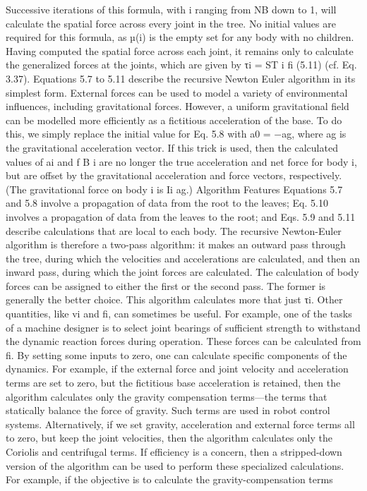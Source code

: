 Successive iterations of this formula, with i ranging from NB down to 1, will calculate the spatial force across every joint in the tree. No initial values are required for this formula, as µ(i) is the empty set for any body with no children. Having computed the spatial force across each joint, it remains only to calculate the generalized forces at the joints, which are given by τi = ST i fi (5.11) (cf. Eq. 3.37). Equations 5.7 to 5.11 describe the recursive Newton Euler algorithm in its simplest form. External forces can be used to model a variety of environmental influences, including gravitational forces. However, a uniform gravitational field can be modelled more efficiently as a fictitious acceleration of the base. To do this, we simply replace the initial value for Eq. 5.8 with a0 = −ag, where ag is the gravitational acceleration vector. If this trick is used, then the calculated values of ai and f B i are no longer the true acceleration and net force for body i, but are offset by the gravitational acceleration and force vectors, respectively. (The gravitational force on body i is Ii ag.) Algorithm Features Equations 5.7 and 5.8 involve a propagation of data from the root to the leaves; Eq. 5.10 involves a propagation of data from the leaves to the root; and Eqs. 5.9 and 5.11 describe calculations that are local to each body. The recursive Newton-Euler algorithm is therefore a two-pass algorithm: it makes an outward pass through the tree, during which the velocities and accelerations are calculated, and then an inward pass, during which the joint forces are calculated. The calculation of body forces can be assigned to either the first or the second pass. The former is generally the better choice. This algorithm calculates more that just τi. Other quantities, like vi and fi, can sometimes be useful. For example, one of the tasks of a machine designer is to select joint bearings of sufficient strength to withstand the dynamic reaction forces during operation. These forces can be calculated from fi. By setting some inputs to zero, one can calculate specific components of the dynamics. For example, if the external force and joint velocity and acceleration terms are set to zero, but the fictitious base acceleration is retained, then the algorithm calculates only the gravity compensation terms—the terms that statically balance the force of gravity. Such terms are used in robot control systems. Alternatively, if we set gravity, acceleration and external force terms all to zero, but keep the joint velocities, then the algorithm calculates only the Coriolis and centrifugal terms. If efficiency is a concern, then a stripped-down version of the algorithm can be used to perform these specialized calculations. For example, if the objective is to calculate the gravity-compensation terms

